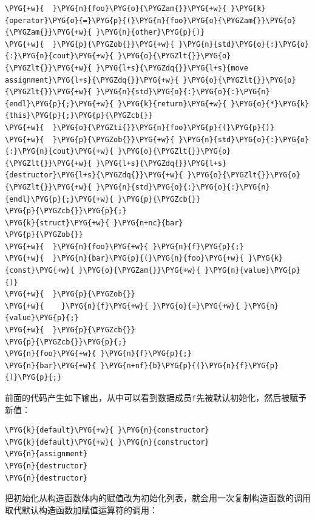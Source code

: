 \begin{codeblockbg}
\begin{Verbatim}[commandchars=\\\{\},breaklines=true,breakanywhere=true,fontsize=\codefont,xleftmargin=17bp]
\PYG{+w}{  }\PYG{n}{foo}\PYG{o}{\PYGZam{}}\PYG{+w}{ }\PYG{k}{operator}\PYG{o}{=}\PYG{p}{(}\PYG{n}{foo}\PYG{o}{\PYGZam{}}\PYG{o}{\PYGZam{}}\PYG{+w}{ }\PYG{n}{other}\PYG{p}{)}
\PYG{+w}{  }\PYG{p}{\PYGZob{}}\PYG{+w}{ }\PYG{n}{std}\PYG{o}{:}\PYG{o}{:}\PYG{n}{cout}\PYG{+w}{ }\PYG{o}{\PYGZlt{}}\PYG{o}{\PYGZlt{}}\PYG{+w}{ }\PYG{l+s}{\PYGZdq{}}\PYG{l+s}{move assignment}\PYG{l+s}{\PYGZdq{}}\PYG{+w}{ }\PYG{o}{\PYGZlt{}}\PYG{o}{\PYGZlt{}}\PYG{+w}{ }\PYG{n}{std}\PYG{o}{:}\PYG{o}{:}\PYG{n}{endl}\PYG{p}{;}\PYG{+w}{ }\PYG{k}{return}\PYG{+w}{ }\PYG{o}{*}\PYG{k}{this}\PYG{p}{;}\PYG{p}{\PYGZcb{}}
\PYG{+w}{  }\PYG{o}{\PYGZti{}}\PYG{n}{foo}\PYG{p}{(}\PYG{p}{)}
\PYG{+w}{  }\PYG{p}{\PYGZob{}}\PYG{+w}{ }\PYG{n}{std}\PYG{o}{:}\PYG{o}{:}\PYG{n}{cout}\PYG{+w}{ }\PYG{o}{\PYGZlt{}}\PYG{o}{\PYGZlt{}}\PYG{+w}{ }\PYG{l+s}{\PYGZdq{}}\PYG{l+s}{destructor}\PYG{l+s}{\PYGZdq{}}\PYG{+w}{ }\PYG{o}{\PYGZlt{}}\PYG{o}{\PYGZlt{}}\PYG{+w}{ }\PYG{n}{std}\PYG{o}{:}\PYG{o}{:}\PYG{n}{endl}\PYG{p}{;}\PYG{+w}{ }\PYG{p}{\PYGZcb{}}
\PYG{p}{\PYGZcb{}}\PYG{p}{;}
\PYG{k}{struct}\PYG{+w}{ }\PYG{n+nc}{bar}
\PYG{p}{\PYGZob{}}
\PYG{+w}{  }\PYG{n}{foo}\PYG{+w}{ }\PYG{n}{f}\PYG{p}{;}
\PYG{+w}{  }\PYG{n}{bar}\PYG{p}{(}\PYG{n}{foo}\PYG{+w}{ }\PYG{k}{const}\PYG{+w}{ }\PYG{o}{\PYGZam{}}\PYG{+w}{ }\PYG{n}{value}\PYG{p}{)}
\PYG{+w}{  }\PYG{p}{\PYGZob{}}
\PYG{+w}{    }\PYG{n}{f}\PYG{+w}{ }\PYG{o}{=}\PYG{+w}{ }\PYG{n}{value}\PYG{p}{;}
\PYG{+w}{  }\PYG{p}{\PYGZcb{}}
\PYG{p}{\PYGZcb{}}\PYG{p}{;}
\PYG{n}{foo}\PYG{+w}{ }\PYG{n}{f}\PYG{p}{;}
\PYG{n}{bar}\PYG{+w}{ }\PYG{n+nf}{b}\PYG{p}{(}\PYG{n}{f}\PYG{p}{)}\PYG{p}{;}
\end{Verbatim}
\end{codeblockbg}



前面的代码产生如下输出，从中可以看到数据成员\texttt{f}先被默认初始化，然后被赋予新值：



\begin{codeblockbg}
\begin{Verbatim}[commandchars=\\\{\},breaklines=true,breakanywhere=true,fontsize=\codefont,xleftmargin=17bp]
\PYG{k}{default}\PYG{+w}{ }\PYG{n}{constructor}
\PYG{k}{default}\PYG{+w}{ }\PYG{n}{constructor}
\PYG{n}{assignment}
\PYG{n}{destructor}
\PYG{n}{destructor}
\end{Verbatim}
\end{codeblockbg}



把初始化从构造函数体内的赋值改为初始化列表，就会用一次复制构造函数的调用取代默认构造函数加赋值运算符的调用：


